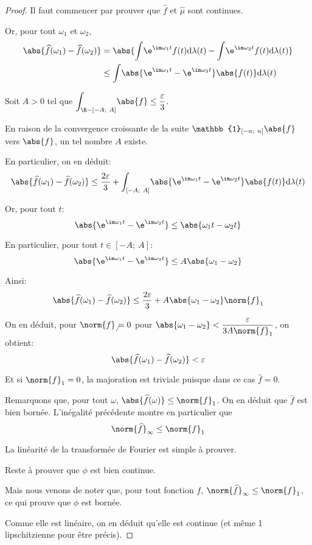 \begin{proof}
Il faut commencer par prouver que $\widehat{f}$ et $\widehat{\mu}$ sont continues.

Or, pour tout $\omega_1$ et $\omega_2$, 
\begin{align*}
\abs{\widehat{f}(\omega_1)-\widehat{f}(\omega_2)} & = \abs{\displaystyle{\int} \e^{\im \omega_1 t} f(t) \mathrm d \lambda(t) - \displaystyle{\int} \e^{\im \omega_2 t} f(t) \mathrm d \lambda(t)} \\
 & \leq \displaystyle{\int} \abs{\e^{\im \omega_1 t}-\e^{\im \omega_2 t}} \abs{f(t)}  \mathrm d \lambda(t)
\end{align*}

Soit $A>0$ tel que $\displaystyle{\int_{\R-[-A;~A]}} \abs{f} \leq \dfrac{\varepsilon}{3}$. 

En raison de la convergence croissante de la suite $\mathbb{1}_{[-n;~n]} \abs{f}$ vers $\abs{f}$, un tel nombre $A$ existe.

En particulier, on en déduit:
\[
\abs{\widehat{f}(\omega_1)-\widehat{f}(\omega_2)} \leq \dfrac{2 \varepsilon}{3} + \displaystyle{\int_{[-A;~A]}} \abs{\e^{\im \omega_1 t}-\e^{\im \omega_2 t}} \abs{f(t)}  \mathrm d \lambda(t)
\]

Or, pour tout $t$:
\[
\abs{\e^{\im \omega_1 t}-\e^{\im \omega_2 t}} \leq \abs{\omega_1 t - \omega_2 t}
\]

En particulier, pour tout $t \in [-A;~A]$:
\[
\abs{\e^{\im \omega_1 t}-\e^{\im \omega_2 t}} \leq A \abs{\omega_1  - \omega_2}
\]

Ainsi:
\[
\abs{\widehat{f}(\omega_1)-\widehat{f}(\omega_2)} \leq \dfrac{2 \varepsilon}{3} + A \abs{\omega_1  - \omega_2} \norm{f}_1
\]

On en déduit, pour $\norm{f}_ \neq 0$ pour $\abs{\omega_1  - \omega_2} < \dfrac{\varepsilon}{3 A \norm{f}_1}$, on obtient:
\[
\abs{\widehat{f}(\omega_1)-\widehat{f}(\omega_2)} < \varepsilon
\]

Et si $\norm{f}_1=0$, la majoration est triviale puisque dans ce cas $\widehat{f}=0$.


Remarquons que, pour tout $\omega$, $\abs{\widehat{f}(\omega)} \leq \norm{f}_1$. On en déduit que $\widehat{f}$ est bien bornée. L'inégalité précédente montre en particulier que 
\[
\norm{\widehat{f}}_{\infty} \leq \norm{f}_1
\]


La linéarité de la transformée de Fourier est simple à prouver.

Reste à prouver que $\phi$ est bien continue. 

Mais nous venons de noter que, pour tout fonction $f$, $\norm{\widehat{f}}_{\infty} \leq \norm{f}_1$, ce qui prouve que $\phi$ est bornée. 

Comme elle est linéaire, on en déduit qu'elle est continue (et même 1 lipschitzienne pour être précis).
\end{proof}


